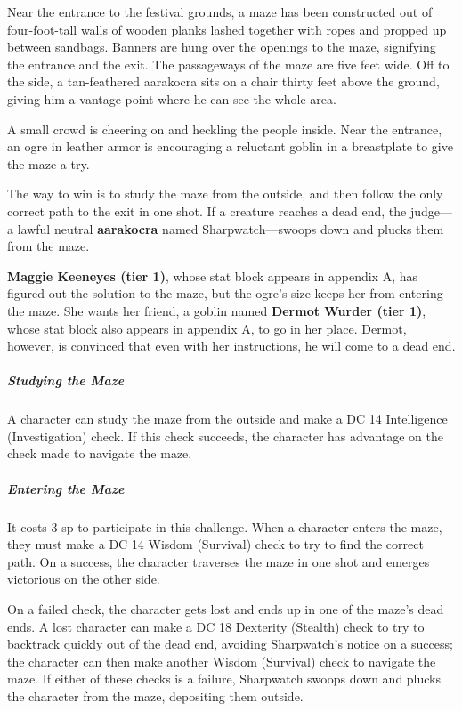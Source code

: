 \documentclass[10pt,a4paper,twoside,bg=print,twocolumn,openany,nodeprecatedcode]{dndbook}
\begin{document}
\begin{DndReadAloud}{}
Near the entrance to the festival grounds, a maze has been constructed out of four-foot-tall walls of wooden planks lashed together with ropes and propped up between sandbags. Banners are hung over the openings to the maze, signifying the entrance and the exit. The passageways of the maze are five feet wide. Off to the side, a tan-feathered aarakocra sits on a chair thirty feet above the ground, giving him a vantage point where he can see the whole area.

A small crowd is cheering on and heckling the people inside. Near the entrance, an ogre in leather armor is encouraging a reluctant goblin in a breastplate to give the maze a try.

\end{DndReadAloud}

The way to win is to study the maze from the outside, and then follow the only correct path to the exit in one shot. If a creature reaches a dead end, the judge—a lawful neutral \textbf{aarakocra} named Sharpwatch—swoops down and plucks them from the maze.

\textbf{Maggie Keeneyes (tier 1)}, whose stat block appears in appendix A, has figured out the solution to the maze, but the ogre's size keeps her from entering the maze. She wants her friend, a goblin named \textbf{Dermot Wurder (tier 1)}, whose stat block also appears in appendix A, to go in her place. Dermot, however, is convinced that even with her instructions, he will come to a dead end.

\subparagraph{Studying the Maze}
A character can study the maze from the outside and make a DC 14 Intelligence (Investigation) check. If this check succeeds, the character has advantage on the check made to navigate the maze.

\subparagraph{Entering the Maze}
It costs 3 sp to participate in this challenge. When a character enters the maze, they must make a DC 14 Wisdom (Survival) check to try to find the correct path. On a success, the character traverses the maze in one shot and emerges victorious on the other side.

On a failed check, the character gets lost and ends up in one of the maze's dead ends. A lost character can make a DC 18 Dexterity (Stealth) check to try to backtrack quickly out of the dead end, avoiding Sharpwatch's notice on a success; the character can then make another Wisdom (Survival) check to navigate the maze. If either of these checks is a failure, Sharpwatch swoops down and plucks the character from the maze, depositing them outside.
\end{document}
